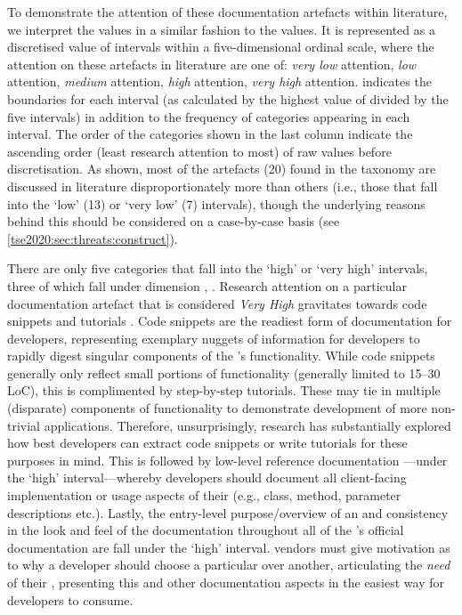 To demonstrate the attention of these documentation artefacts within literature, we interpret the  values in a similar fashion to the  values. It is represented as a discretised value of intervals within a five-dimensional ordinal scale, where the attention on these artefacts in literature are one of: \textit{very low} attention, \textit{low} attention, \textit{medium} attention, \textit{high} attention, \textit{very high} attention.  indicates the boundaries for each interval (as calculated by the highest  value of \dimcatILSvalueAFive{} divided by the five intervals) in addition to the frequency of categories appearing in each interval. The order of the categories shown in the last column indicate the ascending order (least research attention to most) of raw  values before discretisation. As shown, most of the artefacts (20) found in the taxonomy are discussed in literature disproportionately more than others (i.e., those that fall into the `low' (13) or `very low' (7) intervals), though the underlying reasons behind this should be considered on a case-by-case basis (see \cref{tse2020:sec:threats:construct}).

There are only five categories that fall into the `high' or `very high' intervals, three of which fall under dimension , \dima{}. Research attention on a particular documentation artefact that is considered \textit{Very High} gravitates towards code snippets  and tutorials . Code snippets are the readiest form of  documentation for developers, representing exemplary nuggets of information for developers to rapidly digest singular components of the 's functionality. While code snippets generally only reflect small portions of  functionality (generally limited to 15--30 LoC), this is complimented by step-by-step tutorials. These may tie in multiple (disparate) components of  functionality to demonstrate development of more non-trivial applications. Therefore, unsurprisingly, research has substantially explored how best  developers can extract code snippets or write tutorials for these purposes in mind. This is followed by low-level reference documentation ---under the `high' interval---whereby developers should document all client-facing implementation or usage aspects of their  (e.g., class, method, parameter descriptions etc.).
Lastly, the entry-level purpose/overview of an   and consistency in the look and feel of the documentation throughout all of the 's official documentation  are fall under the `high' interval.  vendors must give motivation as to why a developer should choose a particular  over another, articulating the \textit{need} of their , presenting this and other documentation aspects in the easiest way for developers to consume.

